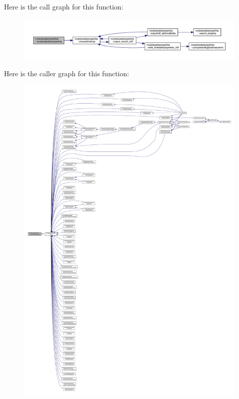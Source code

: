 Here is the call graph for this function\+:\nopagebreak
\begin{figure}[H]
\begin{center}
\leavevmode
\includegraphics[width=350pt]{namespacemodulewaterproperties_ae4516d6c7f3687b0293515314b0ade90_cgraph}
\end{center}
\end{figure}
Here is the caller graph for this function\+:\nopagebreak
\begin{figure}[H]
\begin{center}
\leavevmode
\includegraphics[width=350pt]{namespacemodulewaterproperties_ae4516d6c7f3687b0293515314b0ade90_icgraph}
\end{center}
\end{figure}
\mbox{\label{namespacemodulewaterproperties_aa89a84314cb0905ce7ee9f02c7c35393}} 
